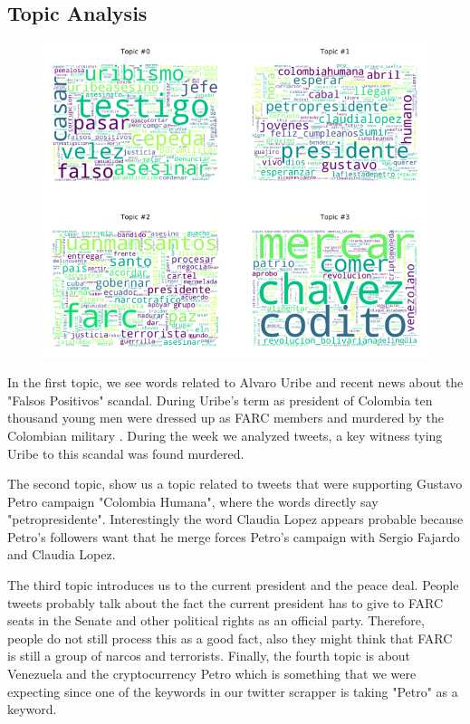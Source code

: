 \documentclass[10pt,a4paper]{article} %
\begin{document}
\subsection{Topic Analysis}
\begin{figure}[h!]
\includegraphics[width=0.975\linewidth]{week_16.png}
\centering
\end{figure}


In the first topic, we see words related to Alvaro Uribe and recent news about the "Falsos Positivos" scandal.  During Uribe's term as president of Colombia ten thousand young men were dressed up as FARC members and murdered by the Colombian military \cite{falso_positivos_1} \cite{falso_positivos_2}.  During the week we analyzed tweets, a key witness tying Uribe to this scandal was found murdered.

The second topic, show us a topic related to tweets that were supporting Gustavo Petro campaign "Colombia Humana", where the words directly say "petropresidente". Interestingly the word Claudia Lopez appears probable because Petro's followers want that he merge forces Petro's campaign with Sergio Fajardo and Claudia Lopez.

The third topic introduces us to the current president and the peace deal. People tweets probably talk about the fact the current president has to give to FARC seats in the Senate and other political rights as an official party. Therefore, people do not still process this as a good fact, also they might think that FARC is still a group of narcos and terrorists. Finally, the fourth topic is about Venezuela and the cryptocurrency Petro which is something that we were expecting since one of the keywords in our twitter scrapper is taking "Petro" as a keyword.
\end{document}
